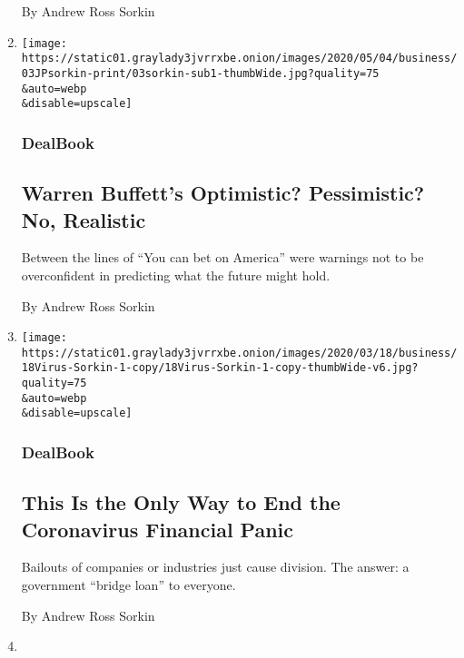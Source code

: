 \begin{enumerate}
  By Andrew Ross Sorkin
\item
  \href{/2020/05/03/business/dealbook/warren-buffett-berkshire-hathaway.html}{}

  \texttt{[image: https://static01.graylady3jvrrxbe.onion/images/2020/05/04/business/03JPsorkin-print/03sorkin-sub1-thumbWide.jpg?quality=75\\\&auto=webp\\\&disable=upscale]}

  \hypertarget{dealbook-1}{%
  \subsubsection{DealBook}\label{dealbook-1}}

  \hypertarget{warren-buffetts-optimistic-pessimistic-no-realistic}{%
  \subsection{Warren Buffett's Optimistic? Pessimistic? No,
  Realistic}\label{warren-buffetts-optimistic-pessimistic-no-realistic}}

  Between the lines of ``You can bet on America'' were warnings not to
  be overconfident in predicting what the future might hold.

  By Andrew Ross Sorkin
\item
  \href{/2020/03/18/business/dealbook/coronavirus-economy-bailout-plan.html}{}

  \texttt{[image: https://static01.graylady3jvrrxbe.onion/images/2020/03/18/business/18Virus-Sorkin-1-copy/18Virus-Sorkin-1-copy-thumbWide-v6.jpg?quality=75\\\&auto=webp\\\&disable=upscale]}

  \hypertarget{dealbook-2}{%
  \subsubsection{DealBook}\label{dealbook-2}}

  \hypertarget{this-is-the-only-way-to-end-the-coronavirus-financial-panic}{%
  \subsection{This Is the Only Way to End the Coronavirus Financial
  Panic}\label{this-is-the-only-way-to-end-the-coronavirus-financial-panic}}

  Bailouts of companies or industries just cause division. The answer: a
  government ``bridge loan'' to everyone.

  By Andrew Ross Sorkin
\item
  \href{/2020/03/16/business/fed-discount-window.html}{}


\end{enumerate}
